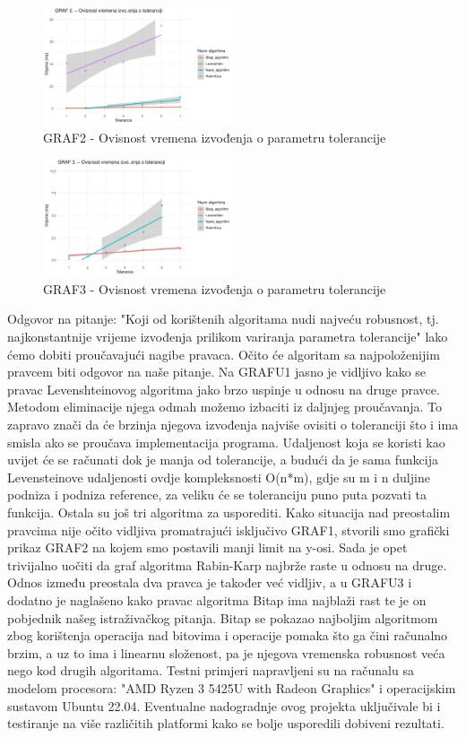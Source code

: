 \documentclass[conference]{IEEEtran}
\begin{document}
\begin{figure}[htbp]
\centerline{\includegraphics[width=0.5\textwidth]{Grafovi_i_csv_datoteke/GRAF2.png}}
\caption{GRAF2 - Ovisnost vremena izvođenja o parametru tolerancije}
\label{fig}
\end{figure}

\begin{figure}[htbp]
\centerline{\includegraphics[width=0.5\textwidth]{Grafovi_i_csv_datoteke/GRAF3.png}}
\caption{GRAF3 - Ovisnost vremena izvođenja o parametru tolerancije}
\label{fig}
\end{figure}
\newpage
Odgovor na pitanje: "Koji od korištenih algoritama nudi najveću robusnost, tj. najkonstantnije vrijeme izvođenja prilikom variranja parametra tolerancije" lako ćemo dobiti proučavajući nagibe pravaca. Očito će algoritam sa najpoloženijim pravcem biti odgovor na naše pitanje. 
Na GRAFU1 jasno je vidljivo kako se pravac Levenshteinovog algoritma jako brzo uspinje u odnosu na druge pravce. Metodom eliminacije njega odmah možemo izbaciti iz daljnjeg proučavanja.
To zapravo znači da će brzinja njegova izvođenja najviše ovisiti o toleranciji što i ima smisla ako se proučava implementacija programa. Udaljenost koja se koristi kao uvijet će se računati dok je manja od tolerancije, a budući da je sama funkcija Levensteinove udaljenosti ovdje kompleksnosti O(n*m), gdje su m i n duljine podniza i podniza reference, za veliku će se toleranciju puno puta pozvati ta funkcija. Ostala su još tri algoritma za usporediti.
Kako situacija nad preostalim pravcima nije očito vidljiva promatrajući isključivo GRAF1, stvorili smo grafički prikaz GRAF2 na kojem smo postavili manji limit na y-osi. Sada je opet trivijalno uočiti da graf algoritma Rabin-Karp najbrže raste u odnosu na druge.
Odnos između preostala dva pravca je također već vidljiv, a u GRAFU3 i dodatno je naglašeno kako pravac algoritma Bitap ima najblaži rast te je on pobjednik našeg istraživačkog pitanja. 
Bitap se pokazao najboljim algoritmom zbog korištenja operacija nad bitovima i operacije pomaka što ga čini računalno brzim, a uz to ima i linearnu složenost, pa je njegova vremenska robusnost veća nego kod drugih algoritama.
Testni primjeri napravljeni su na računalu sa modelom procesora: "AMD Ryzen 3 5425U with Radeon Graphics" i operacijskim sustavom Ubuntu 22.04. Eventualne nadogradnje ovog projekta uključivale bi i testiranje na više različitih platformi kako se bolje usporedili dobiveni rezultati.
\end{document}
